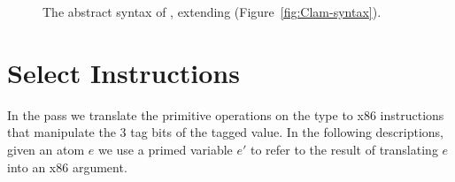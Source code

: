 \documentclass[7x10,nocrop]{TimesAPriori_MIT}%
\newcommand{\gray}[1]{{\color{gray} #1}}
\def\racketEd{0}
\def\pythonEd{1}
\def\edition{0}
\begin{document}
\begin{figure}[tp]
\fbox{
\begin{minipage}{0.96\textwidth}
\small
{\if\edition\racketEd
\[
\begin{array}{lcl}
\Exp &::= & \ldots
   \MID \BINOP{\key{'any-vector-ref}}{\Atm}{\Atm}  \\
   &\MID& (\key{Prim}~\key{'any-vector-set!}\,(\key{list}\,\Atm\,\Atm\,\Atm))\\
   &\MID& \VALUEOF{\Exp}{\FType} \\
\Stmt &::=& \gray{ \ASSIGN{\VAR{\Var}}{\Exp} 
  \MID \LP\key{Collect} \,\itm{int}\RP }\\
\Tail &::= & \gray{ \RETURN{\Exp} \MID \SEQ{\Stmt}{\Tail} 
       \MID \GOTO{\itm{label}} } \\
    &\MID& \gray{ \IFSTMT{\BINOP{\itm{cmp}}{\Atm}{\Atm}}{\GOTO{\itm{label}}}{\GOTO{\itm{label}}}  }\\
&\MID& \gray{ \TAILCALL{\Atm}{\Atm\ldots} } 
  \MID \LP\key{Exit}\RP \\
\Def &::=& \gray{ \DEF{\itm{label}}{\LP[\Var\key{:}\Type]\ldots\RP}{\Type}{\itm{info}}{\LP\LP\itm{label}\,\key{.}\,\Tail\RP\ldots\RP} }\\
\LangCAnyM{} & ::= & \gray{ \PROGRAMDEFS{\itm{info}}{\LP\Def\ldots\RP} }
\end{array}
\]
\fi}
{\if\edition\pythonEd
\[
  \begin{array}{l}
  \gray{\CifASTPython} \\ \hline
  \gray{\CtupASTPython} \\ \hline
  \gray{\CfunASTPython} \\ \hline
  \gray{\ClambdaASTPython} \\ \hline
  \CanyASTPython \\
  \begin{array}{lcl}
    \LangCAnyM{} & ::= & \CPROGRAMDEFS{\LS\Def\code{,}\ldots\RS} 
  \end{array}
  \end{array}
\]
\fi}
\end{minipage}
}
\caption{The abstract syntax of \LangCAny{}, extending \LangCLam{} (Figure~\ref{fig:Clam-syntax}).}
\label{fig:c5-syntax}
\end{figure}


\section{Select Instructions}
\label{sec:select-Rany}

In the  pass we translate the primitive
operations on the \ANYTY{} type to x86 instructions that manipulate
the 3 tag bits of the tagged value. In the following descriptions,
given an atom $e$ we use a primed variable $e'$ to refer to the result
of translating $e$ into an x86 argument.
\end{document}
